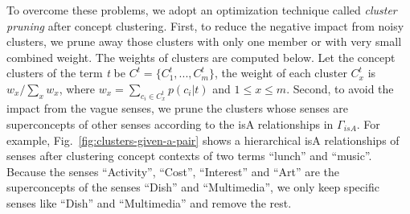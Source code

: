 To overcome these problems, we adopt an optimization technique called
{\em cluster pruning} after concept clustering.
First, to reduce the negative impact from noisy clusters,
we prune away those clusters with only one member or with very small combined weight.
The weights of clusters are computed below. Let the concept clusters of the term \emph{t} be $C^t = \{C^t_1,...,C^t_m\}$,
the weight of each cluster $C_x^{t}$ is $w_x/\sum_{x}w_x$, where
$w_x = \sum_{c_i\in C_x^{t}}p(c_i|t)$ and $1 \leq x \leq m$.
Second, to avoid the impact from the vague senses, we prune the clusters
whose senses are superconcepts of other senses according to the isA relationships
in $\Gamma_{isA}$. For example, Fig.~\ref{fig:clusters-given-a-pair}
shows a hierarchical isA relationships of senses after clustering concept
contexts of two terms ``lunch'' and ``music''. Because the senses ``Activity'',
``Cost'', ``Interest'' and ``Art'' are the superconcepts of the senses ``Dish'' and
``Multimedia'', we only keep specific senses like ``Dish'' and ``Multimedia'' and
remove the rest.


